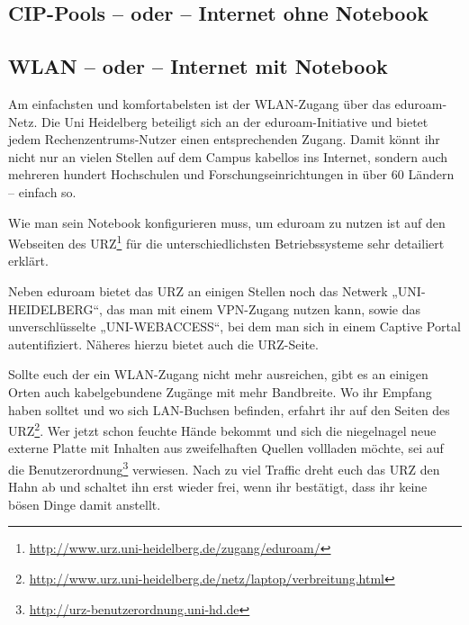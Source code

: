 \subsection*{CIP-Pools -- oder -- Internet ohne Notebook} %

\subsection*{WLAN -- oder -- Internet mit Notebook}
Am einfachsten und komfortabelsten ist der WLAN-Zugang über das e\-du\-roam-Netz.
Die Uni Heidelberg beteiligt sich an der eduroam-Initiative und bietet jedem Rechenzentrums-Nutzer einen entsprechenden Zugang. Damit könnt ihr nicht nur an vielen Stellen auf dem Campus kabellos ins Internet, sondern auch mehreren hundert Hochschulen und Forschungseinrichtungen in über 60 Ländern – einfach so.

Wie man sein Notebook konfigurieren muss, um eduroam zu nutzen ist auf den Webseiten des URZ\footnote{\url{http://www.urz.uni-heidelberg.de/zugang/eduroam/}} für die unterschiedlichsten Betriebssysteme sehr detailiert erklärt.

Neben eduroam bietet das URZ an einigen Stellen noch das Netwerk „UNI-HEIDELBERG“, das man mit einem VPN-Zugang nutzen kann, sowie das unverschlüsselte „UNI-WEBACCESS“, bei dem man sich in einem Captive Portal autentifiziert. Näheres hierzu bietet auch die URZ-Seite.%

Sollte euch der ein WLAN-Zugang nicht mehr ausreichen, gibt es an einigen Orten auch kabelgebundene Zugänge mit mehr Bandbreite. Wo ihr Empfang haben solltet und wo sich LAN-Buchsen befinden, erfahrt ihr auf den Seiten des \gls{URZ}\footnote{\url{http://www.urz.uni-heidelberg.de/netz/laptop/verbreitung.html}}. Wer jetzt schon feuchte Hände bekommt und sich die niegelnagel neue externe Platte mit Inhalten aus zweifelhaften Quellen vollladen möchte, sei auf die Benutzerordnung\footnote{\url{http://urz-benutzerordnung.uni-hd.de}} verwiesen. Nach zu viel Traffic dreht euch das \gls{URZ} den Hahn ab und schaltet ihn erst wieder frei, wenn ihr bestätigt, dass ihr keine bösen Dinge damit anstellt.

